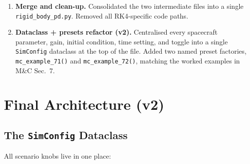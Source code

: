 \begin{enumerate}
        Replaced the hand-rolled RK4 loop with
        \texttt{scipy.integrate.solve\_ivp} (adaptive RK45). Quaternion
        re-normalisation moved from per-step to post-processing.
  \item \textbf{Merge and clean-up.}
        Consolidated the two intermediate files into a single
        \texttt{rigid\_body\_pd.py}. Removed all RK4-specific code paths.
  \item \textbf{Dataclass + presets refactor (v2).}
        Centralised every spacecraft parameter, gain, initial condition,
        time setting, and toggle into a single \texttt{SimConfig} dataclass
        at the top of the file. Added two named preset factories,
        \texttt{mc\_example\_71()} and \texttt{mc\_example\_72()}, matching
        the worked examples in M\&C Sec.~7.
\end{enumerate}


\section{Final Architecture (v2)}

\subsection{The \texttt{SimConfig} Dataclass}

All scenario knobs live in one place:

